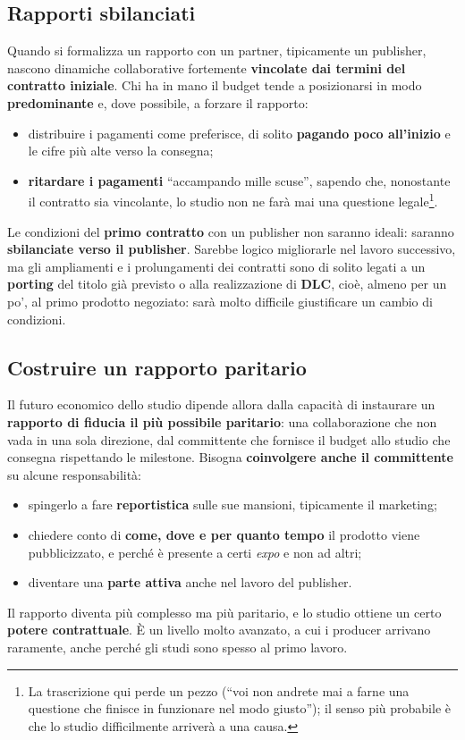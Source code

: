 \subsection{Rapporti sbilanciati}

Quando si formalizza un rapporto con un partner, tipicamente un publisher,
nascono dinamiche collaborative fortemente \textbf{vincolate dai termini del
contratto iniziale}. Chi ha in mano il budget tende a posizionarsi in modo
\textbf{predominante} e, dove possibile, a forzare il rapporto:
\begin{itemize}
  \item distribuire i pagamenti come preferisce, di solito \textbf{pagando poco
        all'inizio} e le cifre più alte verso la consegna;
  \item \textbf{ritardare i pagamenti} ``accampando mille scuse'', sapendo che,
        nonostante il contratto sia vincolante, lo studio non ne farà mai una
        questione legale\footnote{La trascrizione qui perde un pezzo (``voi non
        andrete mai a farne una questione che finisce in funzionare nel modo
        giusto''); il senso più probabile è che lo studio difficilmente arriverà
        a una causa.}.
\end{itemize}
Le condizioni del \textbf{primo contratto} con un publisher non saranno ideali:
saranno \textbf{sbilanciate verso il publisher}. Sarebbe logico migliorarle nel
lavoro successivo, ma gli ampliamenti e i prolungamenti dei contratti sono di
solito legati a un \textbf{porting} del titolo già previsto o alla realizzazione
di \textbf{DLC}, cioè, almeno per un po', al primo prodotto negoziato: sarà molto
difficile giustificare un cambio di condizioni.

\subsection{Costruire un rapporto paritario}

Il futuro economico dello studio dipende allora dalla capacità di instaurare un
\textbf{rapporto di fiducia il più possibile paritario}: una collaborazione che
non vada in una sola direzione, dal committente che fornisce il budget allo
studio che consegna rispettando le milestone. Bisogna \textbf{coinvolgere anche
il committente} su alcune responsabilità:
\begin{itemize}
  \item spingerlo a fare \textbf{reportistica} sulle sue mansioni, tipicamente il
        marketing;
  \item chiedere conto di \textbf{come, dove e per quanto tempo} il prodotto
        viene pubblicizzato, e perché è presente a certi \emph{expo} e non ad
        altri;
  \item diventare una \textbf{parte attiva} anche nel lavoro del publisher.
\end{itemize}
Il rapporto diventa più complesso ma più paritario, e lo studio ottiene un
certo \textbf{potere contrattuale}. È un livello molto avanzato, a cui i
producer arrivano raramente, anche perché gli studi sono spesso al primo lavoro.

